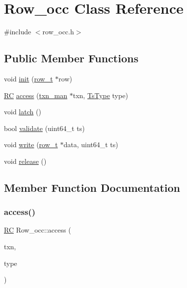 \hypertarget{classRow__occ}{}\section{Row\+\_\+occ Class Reference}
\label{classRow__occ}


{\ttfamily \#include $<$row\+\_\+occ.\+h$>$}

\subsection*{Public Member Functions}
\begin{DoxyCompactItemize}
\item 
void \hyperlink{classRow__occ_abf6ea6681c71eaea7300bc060466ad8e}{init} (\hyperlink{classrow__t}{row\+\_\+t} $\ast$row)
\item 
\hyperlink{global_8h_a78c49a674c810fdd03d20432f7be864a}{RC} \hyperlink{classRow__occ_a51d5e5c53c91e2d3a9ecd9dfe45eecf5}{access} (\hyperlink{classtxn__man}{txn\+\_\+man} $\ast$txn, \hyperlink{global_8h_a1a7f6ca1462293fe053b5ae74a6c4eda}{Ts\+Type} type)
\item 
void \hyperlink{classRow__occ_a0a27281b67a7675a9cc6fd6cf291cdea}{latch} ()
\item 
bool \hyperlink{classRow__occ_afee9bed0ed7de312a90eba7878355950}{validate} (uint64\+\_\+t ts)
\item 
void \hyperlink{classRow__occ_ab7e903b0c2d8d5b2b0f82aaa07b3559f}{write} (\hyperlink{classrow__t}{row\+\_\+t} $\ast$data, uint64\+\_\+t ts)
\item 
void \hyperlink{classRow__occ_aff7840808f4586862c3175439356ef4a}{release} ()
\end{DoxyCompactItemize}


\subsection{Member Function Documentation}
\mbox{\label{classRow__occ_a51d5e5c53c91e2d3a9ecd9dfe45eecf5}} 
\subsubsection{\texorpdfstring{access()}{access()}}
{\footnotesize\ttfamily \hyperlink{global_8h_a78c49a674c810fdd03d20432f7be864a}{RC} Row\+\_\+occ\+::access (\begin{DoxyParamCaption}\item[{\hyperlink{classtxn__man}{txn\+\_\+man} $\ast$}]{txn,  }\item[{\hyperlink{global_8h_a1a7f6ca1462293fe053b5ae74a6c4eda}{Ts\+Type}}]{type }\end{DoxyParamCaption})}

